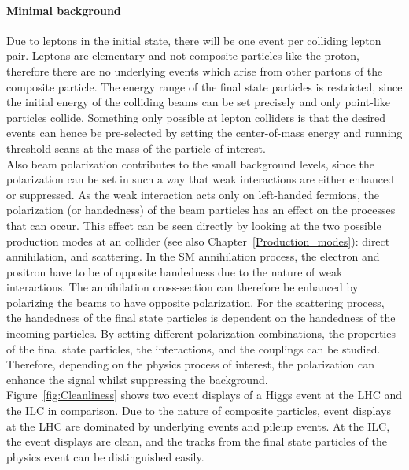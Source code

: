 \paragraph{Minimal background}
Due to leptons in the initial state, there will be one event per colliding lepton pair.
Leptons are elementary and not composite particles like the proton, therefore there are no underlying events which arise from other partons of the composite particle.
The energy range of the final state particles is restricted, since the initial energy of the colliding beams can be set precisely and only point-like particles collide.
Something only possible at lepton colliders is that the desired events can hence be pre-selected by setting the center-of-mass energy and running threshold scans at the mass of the particle of interest.\\
Also beam polarization contributes to the small background levels, since the polarization can be set in such a way that weak interactions are either enhanced or suppressed.
As the weak interaction acts only on left-handed fermions, the polarization (or handedness) of the beam particles has an effect on the processes that can occur.
This effect can be seen directly by looking at the two possible production modes at an \positron\electron collider (see also Chapter~\ref{Production_modes}):
direct \positron\electron annihilation, and \positron\electron scattering.
In the SM annihilation process, the electron and positron have to be of opposite handedness due to the nature of weak interactions.
The annihilation cross-section can therefore be enhanced by polarizing the beams to have opposite polarization.
For the \positron\electron scattering process, the handedness of the final state particles is dependent on the handedness of the incoming particles.
By setting different polarization combinations, the properties of the final state particles, the interactions, and the couplings can be studied. %
Therefore, depending on the physics process of interest, the polarization can enhance the signal whilst suppressing the background. 
\\Figure~\ref{fig:Cleanliness} shows two event displays of a Higgs event at the LHC and the ILC in comparison.
Due to the nature of composite particles, event displays at the LHC are dominated by underlying events and pileup events.
At the ILC, the event displays are clean, and the tracks from the final state particles of the physics event can be distinguished easily.
